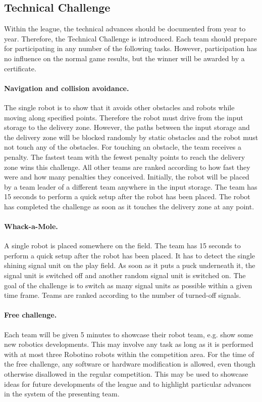 \documentclass[12pt,twoside]{article}
\begin{document}
\subsection{Technical Challenge}
\label{sec:technical-challenge}
Within the league, the technical advances should be documented from
year to year. Therefore, the Technical Challenge is introduced. Each team should prepare for participating in any number of the following
tasks. However, participation has no influence on the normal game results, but the winner will be awarded by a certificate.


\paragraph{Navigation and collision avoidance.~}
The single robot is to show that it avoids other obstacles and robots
while moving along specified points. Therefore the robot must drive
from the input storage to the delivery zone. However, the paths
between the input storage and the delivery zone will be blocked
randomly by static obstacles and the robot must not touch any of the
obstacles. For touching an obstacle, the team receives a penalty.  The
fastest team with the fewest penalty points to reach the delivery zone
wins this challenge. All other teams are ranked according to how fast
they were and how many penalties they conceived. Initially, the robot
will be placed by a team leader of a different team anywhere in the
input storage. The team has 15 seconds to perform a quick setup after
the robot has been placed. The robot has completed the challenge as
soon as it touches the delivery zone at any point.
  
\paragraph{Whack-a-Mole.~}
A single robot is placed somewhere on the field. The team has 15
seconds to perform a quick setup after the robot has been placed. It
has to detect the single shining signal unit on the play field. As
soon as it puts a puck underneath it, the signal unit is switched off
and another random signal unit is switched on. The goal of the
challenge is to switch as many signal units as possible within a given
time frame. Teams are ranked according to the number of turned-off
signals.
  

\paragraph{Free challenge.~}
Each team will be given 5 minutes to showcase their robot team, e.g.
show some new robotics developments. This may involve any task as long
as it is performed with at most three Robotino robots within the
competition area. For the time of the free challenge, any software or
hardware modification is allowed, even though otherwise disallowed in
the regular competition. This may be used to showcase ideas for future
developments of the league and to highlight particular advances in the
system of the presenting team.
\end{document}

